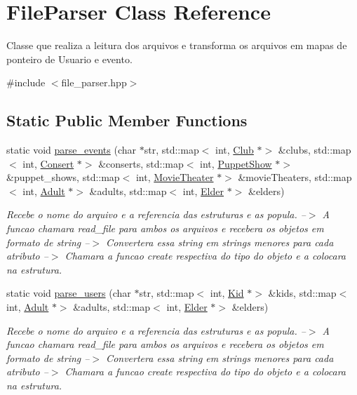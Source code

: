 \hypertarget{class_file_parser}{}\section{File\+Parser Class Reference}
\label{class_file_parser}


Classe que realiza a leitura dos arquivos e transforma os arquivos em mapas de ponteiro de Usuario e evento.  




{\ttfamily \#include $<$file\+\_\+parser.\+hpp$>$}

\subsection*{Static Public Member Functions}
\begin{DoxyCompactItemize}
\item 
static void \hyperlink{class_file_parser_a4aacd1cee3ccf913ab98faca60879f35}{parse\+\_\+events} (char $\ast$str, std\+::map$<$ int, \hyperlink{class_club}{Club} $\ast$$>$ \&clubs, std\+::map$<$ int, \hyperlink{class_consert}{Consert} $\ast$$>$ \&conserts, std\+::map$<$ int, \hyperlink{class_puppet_show}{Puppet\+Show} $\ast$$>$ \&puppet\+\_\+shows, std\+::map$<$ int, \hyperlink{class_movie_theater}{Movie\+Theater} $\ast$$>$ \&movie\+Theaters, std\+::map$<$ int, \hyperlink{class_adult}{Adult} $\ast$$>$ \&adults, std\+::map$<$ int, \hyperlink{class_elder}{Elder} $\ast$$>$ \&elders)
\begin{DoxyCompactList}\small\item\em Recebe o nome do arquivo e a referencia das estruturas e as popula. --$>$ A funcao chamara read\+\_\+file para ambos os arquivos e recebera os objetos em formato de string --$>$ Convertera essa string em strings menores para cada atributo --$>$ Chamara a funcao create respectiva do tipo do objeto e a colocara na estrutura. \end{DoxyCompactList}\item 
static void \hyperlink{class_file_parser_a9a6629f07f5752cfd488b47dc7ac1690}{parse\+\_\+users} (char $\ast$str, std\+::map$<$ int, \hyperlink{class_kid}{Kid} $\ast$$>$ \&kids, std\+::map$<$ int, \hyperlink{class_adult}{Adult} $\ast$$>$ \&adults, std\+::map$<$ int, \hyperlink{class_elder}{Elder} $\ast$$>$ \&elders)
\begin{DoxyCompactList}\small\item\em Recebe o nome do arquivo e a referencia das estruturas e as popula. --$>$ A funcao chamara read\+\_\+file para ambos os arquivos e recebera os objetos em formato de string --$>$ Convertera essa string em strings menores para cada atributo --$>$ Chamara a funcao create respectiva do tipo do objeto e a colocara na estrutura. \end{DoxyCompactList}\end{DoxyCompactItemize}


